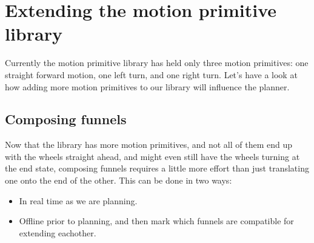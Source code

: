 

\section{Extending the motion primitive library}

Currently the motion primitive library has held only three motion primitives:
one straight forward motion, one left turn, and one right turn. Let's have a
look at how adding more motion primitives to our library will influence the
planner.

\subsection{Composing funnels}

Now that the library has more motion primitives, and not all of them end up with
the wheels straight ahead, and might even still have the wheels turning at the
end state, composing funnels requires a little more effort than just
translating one onto the end of the other. This can be done in two ways:
\begin{itemize}
  \item In real time as we are planning.
  \item Offline prior to planning, and then mark which funnels are compatible
    for extending eachother.
\end{itemize}